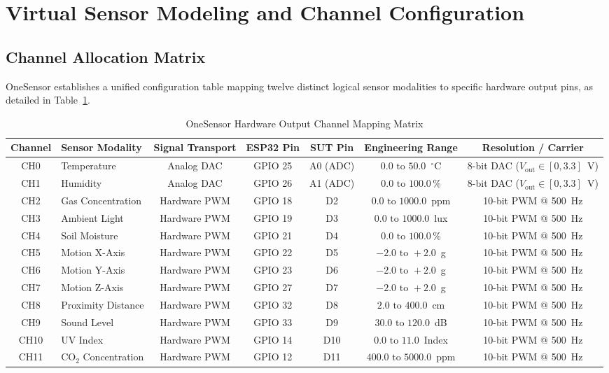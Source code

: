 \documentclass[conference]{IEEEtran}
\begin{document}
\section{Virtual Sensor Modeling and Channel Configuration}
\subsection{Channel Allocation Matrix}
OneSensor establishes a unified configuration table mapping twelve distinct logical sensor modalities to specific hardware output pins, as detailed in Table~\ref{tab:channel_matrix}.

\begin{table}[t]
\caption{OneSensor Hardware Output Channel Mapping Matrix}
\label{tab:channel_matrix}
\centering
\begin{tabular}{clccccc}
\toprule
\textbf{Channel} & \textbf{Sensor Modality} & \textbf{Signal Transport} & \textbf{ESP32 Pin} & \textbf{SUT Pin} & \textbf{Engineering Range} & \textbf{Resolution / Carrier} \\
\midrule
CH0 & Temperature & Analog DAC & GPIO 25 & A0 (ADC) & $0.0\text{ to }50.0$~$^\circ$C & 8-bit DAC ($V_{\text{out}} \in [0, 3.3]$~V) \\
CH1 & Humidity & Analog DAC & GPIO 26 & A1 (ADC) & $0.0\text{ to }100.0$\,\% & 8-bit DAC ($V_{\text{out}} \in [0, 3.3]$~V) \\
CH2 & Gas Concentration & Hardware PWM & GPIO 18 & D2 & $0.0\text{ to }1000.0$~ppm & 10-bit PWM @ 500~Hz \\
CH3 & Ambient Light & Hardware PWM & GPIO 19 & D3 & $0.0\text{ to }1000.0$~lux & 10-bit PWM @ 500~Hz \\
CH4 & Soil Moisture & Hardware PWM & GPIO 21 & D4 & $0.0\text{ to }100.0$\,\% & 10-bit PWM @ 500~Hz \\
CH5 & Motion X-Axis & Hardware PWM & GPIO 22 & D5 & $-2.0\text{ to }+2.0$~g & 10-bit PWM @ 500~Hz \\
CH6 & Motion Y-Axis & Hardware PWM & GPIO 23 & D6 & $-2.0\text{ to }+2.0$~g & 10-bit PWM @ 500~Hz \\
CH7 & Motion Z-Axis & Hardware PWM & GPIO 27 & D7 & $-2.0\text{ to }+2.0$~g & 10-bit PWM @ 500~Hz \\
CH8 & Proximity Distance & Hardware PWM & GPIO 32 & D8 & $2.0\text{ to }400.0$~cm & 10-bit PWM @ 500~Hz \\
CH9 & Sound Level & Hardware PWM & GPIO 33 & D9 & $30.0\text{ to }120.0$~dB & 10-bit PWM @ 500~Hz \\
CH10 & UV Index & Hardware PWM & GPIO 14 & D10 & $0.0\text{ to }11.0$~Index & 10-bit PWM @ 500~Hz \\
CH11 & $\text{CO}_2$ Concentration & Hardware PWM & GPIO 12 & D11 & $400.0\text{ to }5000.0$~ppm & 10-bit PWM @ 500~Hz \\
\bottomrule
\end{tabular}
\end{table}
\end{document}
